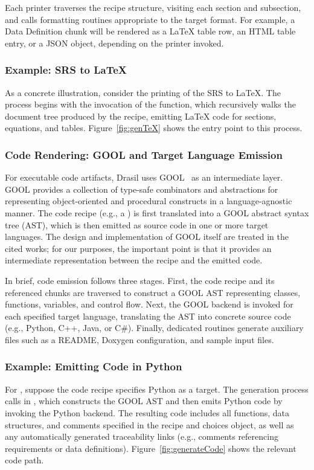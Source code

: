 Each printer traverses the recipe structure, visiting each section and 
subsection, and calls formatting routines appropriate to the target format.
For example, a Data Definition chunk will be rendered as a LaTeX table row, an 
HTML table entry, or a JSON object, depending on the printer invoked.
\subsubsection{Example: SRS to \LaTeX{}}
As a concrete illustration, consider the printing of the \gb{} SRS to 
\LaTeX{}. The process begins with the invocation of the  
function, which recursively walks the document tree produced by the recipe, 
emitting \LaTeX{} code for sections, equations, and tables. 
Figure~\ref{fig:genTeX} shows the entry point to this process.


\subsubsection{Code Rendering: GOOL and Target Language Emission}
For executable code artifacts, Drasil uses GOOL~\citep{Costabile2012,
Carette2020GOOL, maclachlan2020} as an intermediate layer. GOOL provides a 
collection of type-safe combinators and abstractions for representing object-oriented and 
procedural constructs in a language-agnostic manner. The code recipe (e.g., a
) is first translated into a GOOL abstract syntax tree (AST), 
which is then emitted as source code in one or more target languages. The 
design and implementation of GOOL itself are treated in the cited works; for 
our purposes, the important point is that it provides an intermediate 
representation between the recipe and the emitted code.

In brief, code emission follows three stages. First, the code recipe and its
referenced chunks are traversed to construct a GOOL AST representing classes,
functions, variables, and control flow. Next, the GOOL backend is invoked for
each specified target language, translating the AST into concrete source code
(e.g., Python, C++, Java, or C\#). Finally, dedicated routines generate
auxiliary files such as a README, Doxygen configuration, and sample input
files.

\subsubsection{Example: Emitting \gb{} Code in Python}
For \gb{}, suppose the code recipe specifies Python as a target. The 
generation process calls  in 
, which constructs the GOOL 
AST and then emits Python code by invoking the Python backend. The resulting 
code includes all functions, data structures, and comments specified in the 
recipe and choices object, as well as any automatically generated traceability 
links (e.g., comments referencing requirements or data definitions).
Figure~\ref{fig:generateCode} shows the relevant code path.

